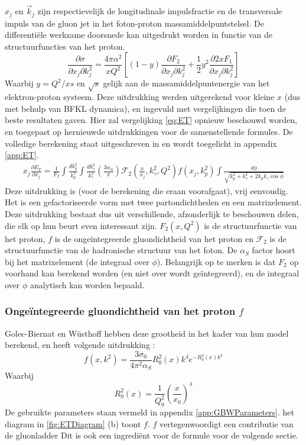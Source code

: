 \documentclass[a4paper,11pt]{article}
\numberwithin{equation}{section} %
\begin{document}
$x_j$  en $\vec{k}_j$ zijn respectievelijk de longitudinale impulsfractie en de transversale impuls van de gluon jet in het foton-proton massamiddelpuntstelsel.
De differentiële werkzame doorsnede kan uitgedrukt worden in functie van de structuurfuncties van het proton.
\begin{equation} \label{eq:SigmaInStructureFunctions}
\frac{\partial \sigma}{\partial x_j \partial k_j^2} = \frac{4 \pi \alpha^2}{xQ^2} \left[ (1-y) \frac{\partial F_2}{\partial x_j \partial k_j^2} + \frac{1}{2} y^2 \frac{\partial 2xF_1}{\partial x_j \partial k_j^2} \right]
\end{equation}
Waarbij $y=Q^2/xs$ en $\sqrt{s}$ gelijk aan de massamiddelpuntenergie van het elektron-proton systeem.
Deze uitdrukking werden uitgerekend voor kleine $x$ (dus met behulp van BFKL dynamica), en ingevuld met vergelijkingen die toen de beste resultaten gaven.
Hier zal vergelijking  \eqref{eq:ET} opnieuw beschouwd worden, en toegepast op hernieuwde uitdrukkingen voor de samenstellende formules.
De volledige berekening staat uitgeschreven in \cite{ET} en wordt toegelicht in appendix \ref{app:ET}.
\begin{align} \label{eq:ET}
x_j \frac{\partial E_T}{\partial x_j} = \frac{1}{F_2} \int \frac{dk_p^2}{k_p^2} \int \frac{dk_\gamma^2}{k_\gamma^2} \left( \frac{3\alpha_S}{\pi} \right) \mathcal{F}_2 \left( \frac{x}{x_j}, k_\gamma^2, Q^2 \right) f(x_j,k_p^2) \int \frac{d\phi}{\sqrt{k_p^2+k_\gamma^2 + 2k_p k_\gamma \cos{\phi}}}
\end{align}
Deze uitdrukking is (voor de berekening die eraan voorafgaat), vrij eenvoudig.
Het is een gefactoriseerde vorm met twee partondichtheden en een matrixelement.
Deze uitdrukking bestaat dus uit verschillende, afzonderlijk te beschouwen delen, die elk op hun beurt even interessant zijn.
$F_2 (x, Q^2)$ is de structuurfunctie van het proton, $f$ is de ongeïntegreerde gluondichtheid van het proton en $\mathcal{F}_2$ is de structuurfunctie van de hadronische structuur van het foton.
De $\alpha_S$ factor hoort bij het matrixelement (de integraal over $\phi$).
Belangrijk op te merken is dat $F_2$ op voorhand kan berekend worden (en niet over wordt geïntegreerd), en de integraal over $\phi$ analytisch kan worden bepaald.
 
    \subsubsection{Ongeïntegreerde gluondichtheid van het proton $f$}
Golec-Biernat en Wüsthoff hebben deze grootheid in het kader van hun model berekend, en heeft volgende uitdrukking \cite[vgl. 9.255]{Barone}:
\begin{equation} \label{eq:UGD}
f(x,k^2) = \frac{3 \sigma_0}{4\pi^2 \alpha_S} R_0^2 (x) k^4 e^{-R_0^2(x) k^2}
\end{equation}
Waarbij
\begin{equation}
R_0^2(x) = \frac{1}{Q_0^2} \left( \frac{x}{x_0} \right)^\lambda
\end{equation}
De gebruikte parameters staan vermeld in appendix \ref{app:GBWParameters}.
het diagram in \ref{fig:ETDiagram} (b) toont $f$.
$f$ vertegenwoordigt een contributie van de gluonladder
Dit is ook een ingrediënt voor de formule voor de volgende sectie.
\end{document}
